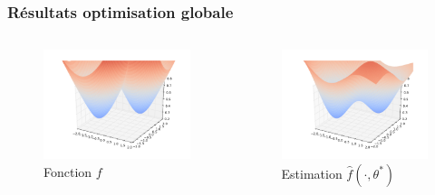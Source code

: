 \documentclass[c]{beamer}
\begin{document}
\begin{frame}
    \frametitle{Résultats optimisation globale}
    \begin{columns}
        \begin{column}{.5\textwidth}
            \begin{figure}
                \centering
                \includegraphics[width=.8\textwidth]{regression_3d-ref}
                \caption{Fonction $f$}
            \end{figure}
        \end{column}
        \begin{column}{.5\textwidth}
            \begin{figure}
                \centering
                \includegraphics[width=.8\textwidth]{regression_3d-est}
                \caption{Estimation $\hat{f}(\cdot, \theta^*)$}
            \end{figure}
        \end{column}
    \end{columns}
\end{frame}
\end{document}
